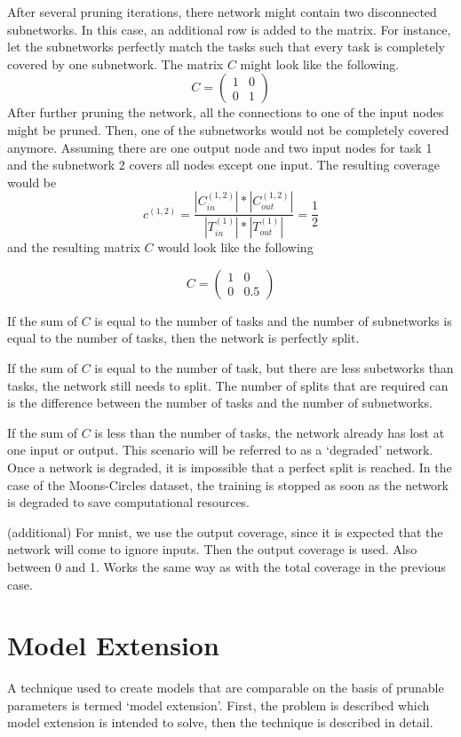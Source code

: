 After several pruning iterations, there network might contain two disconnected subnetworks.
In this case, an additional row is added to the matrix.
For instance, let the subnetworks perfectly match the tasks such that every task is completely covered by one subnetwork.
The matrix $C$ might look like the following.
\[
C = \begin{pmatrix}
    1 & 0 \\ 0 & 1
\end{pmatrix}
\]
After further pruning the network, all the connections to one of the input nodes might be pruned.
Then, one of the subnetworks would not be completely covered anymore.
Assuming there are one output node and two input nodes for task 1 and the subnetwork 2 covers all nodes except one input.
The resulting coverage would be 
\[
c^{(1,2)} =  \frac{
    | C^{(1,2)}_{in}| * | C^{(1,2)}_{out} |
    }{
    |T^{(1)}_{in}| * |T^{(1)}_{out}|
} = \frac{1}{2}
\]
and the resulting matrix $C$ would look like the following

\[
C = \begin{pmatrix}
    1 & 0 \\ 0 & 0.5
\end{pmatrix}
\]

If the sum of $C$ is equal to the number of tasks and the number of subnetworks is equal to the number of tasks, then the network is perfectly split.

If the sum of $C$ is equal to the number of task, but there are less subetworks than tasks, the network still needs to split.
The number of splits that are required can is the difference between the number of tasks and the number of subnetworks.

If the sum of $C$ is less than the number of tasks, the network already has lost at one input or output.
This scenario will be referred to as a `degraded' network.
Once a network is degraded, it is impossible that a perfect split is reached.
In the case of the Moons-Circles dataset, the training is stopped as soon as the network is degraded to save computational resources.

(additional)
For mnist, we use the output coverage, since it is expected that the network will come to ignore inputs.
Then the output coverage is used. Also between 0 and 1. Works the same way as with the total coverage in the previous case.

\section{Model Extension}
A technique used to create models that are comparable on the basis of prunable parameters is termed `model extension'. First, the problem is described which model extension is intended to solve, then the technique is described in detail.

